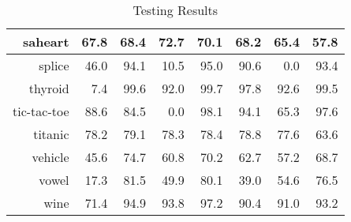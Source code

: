 \documentclass[a4paper,10pt]{article}
\begin{document}
\begin{table}[!htp]
\begin{tabular}{
|r|r|r|r|r|r|r|r|}
\hline
saheart & 67.8 & 68.4 & 72.7 & 70.1 & 68.2 & 65.4 & 57.8\\
\hline
splice & 46.0 & 94.1 & 10.5 & 95.0 & 90.6 & 0.0 & 93.4\\
\hline
thyroid & 7.4 & 99.6 & 92.0 & 99.7 & 97.8 & 92.6 & 99.5\\
\hline
tic-tac-toe & 88.6 & 84.5 & 0.0 & 98.1 & 94.1 & 65.3 & 97.6\\
\hline
titanic & 78.2 & 79.1 & 78.3 & 78.4 & 78.8 & 77.6 & 63.6\\
\hline
vehicle & 45.6 & 74.7 & 60.8 & 70.2 & 62.7 & 57.2 & 68.7\\
\hline
vowel & 17.3 & 81.5 & 49.9 & 80.1 & 39.0 & 54.6 & 76.5\\
\hline
wine & 71.4 & 94.9 & 93.8 & 97.2 & 90.4 & 91.0 & 93.2\\
\hline



\end{tabular}
\caption{Testing Results}
\end{table}
\end{document}
